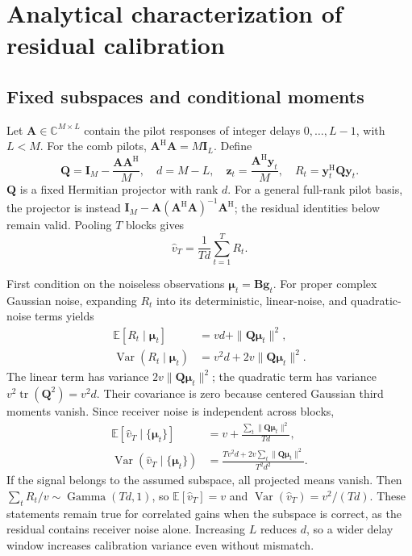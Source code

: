 \section{Analytical characterization of residual calibration}
\label{sec:analysis}

\subsection{Fixed subspaces and conditional moments}
Let $\mathbf A\in\mathbb C^{M\times L}$ contain the pilot responses of integer
delays $0,\ldots,L-1$, with $L<M$. For the comb pilots,
$\mathbf A^{\mathrm H}\mathbf A=M\mathbf I_L$. Define
\begin{equation}
 \mathbf Q=\mathbf I_M-\frac{\mathbf A\mathbf A^{\mathrm H}}{M},
 \quad d=M-L,\quad
 \mathbf z_t=\frac{\mathbf A^{\mathrm H}\mathbf y_t}{M},
 \quad R_t=\mathbf y_t^{\mathrm H}\mathbf Q\mathbf y_t.
 \label{eq:projection}
\end{equation}
$\mathbf Q$ is a fixed Hermitian projector with rank $d$. For a general
full-rank pilot basis, the projector is instead
$\mathbf I_M-\mathbf A(\mathbf A^{\mathrm H}\mathbf A)^{-1}\mathbf A^{\mathrm H}$;
the residual identities below remain valid. Pooling $T$ blocks gives
\begin{equation}
 \widehat v_T=\frac{1}{Td}\sum_{t=1}^{T}R_t.
 \label{eq:vhat}
\end{equation}

First condition on the noiseless observations
$\boldsymbol\mu_t=\mathbf B\mathbf g_t$. For proper complex Gaussian noise,
expanding $R_t$ into its deterministic, linear-noise, and quadratic-noise
terms yields
\begin{align}
 \mathbb E[R_t\mid\boldsymbol\mu_t]
   &=vd+\|\mathbf Q\boldsymbol\mu_t\|^2,\label{eq:conditionalmean}\\
 \operatorname{Var}(R_t\mid\boldsymbol\mu_t)
   &=v^2d+2v\|\mathbf Q\boldsymbol\mu_t\|^2.
 \label{eq:conditionalvariance}
\end{align}
The linear term has variance $2v\|\mathbf Q\boldsymbol\mu_t\|^2$;
the quadratic term has variance $v^2\operatorname{tr}(\mathbf Q^2)=v^2d$.
Their covariance is zero because centered Gaussian third moments vanish.
Since receiver noise is independent across blocks,
\begin{align}
 \mathbb E[\widehat v_T\mid\{\boldsymbol\mu_t\}]
  &=v+\frac{\sum_t\|\mathbf Q\boldsymbol\mu_t\|^2}{Td},
  \label{eq:poolconditionalmean}\\
 \operatorname{Var}(\widehat v_T\mid\{\boldsymbol\mu_t\})
  &=\frac{Tv^2d+2v\sum_t\|\mathbf Q\boldsymbol\mu_t\|^2}{T^2d^2}.
  \label{eq:poolconditionalvariance}
\end{align}
If the signal belongs to the assumed subspace, all projected means vanish.
Then $\sum_tR_t/v\sim\operatorname{Gamma}(Td,1)$, so
$\mathbb E[\widehat v_T]=v$ and
$\operatorname{Var}(\widehat v_T)=v^2/(Td)$. These statements remain true
for correlated gains when the subspace is correct, as the residual contains
receiver noise alone. Increasing $L$ reduces $d$, so a wider delay window
increases calibration variance even without mismatch.

